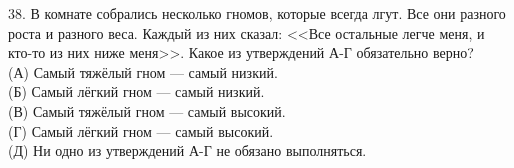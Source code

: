 38. В комнате собрались несколько гномов, которые всегда лгут. Все они разного роста и разного веса. Каждый из них сказал: <<Все остальные легче меня, и кто-то из них ниже меня>>. Какое из утверждений А-Г обязательно верно?\\
(А) Самый тяжёлый гном --- самый низкий.\\
(Б) Самый лёгкий гном --- самый низкий.\\
(В) Самый тяжёлый гном --- самый высокий.\\
(Г) Самый лёгкий гном --- самый высокий.\\
(Д) Ни одно из утверждений А-Г не обязано выполняться.\\
